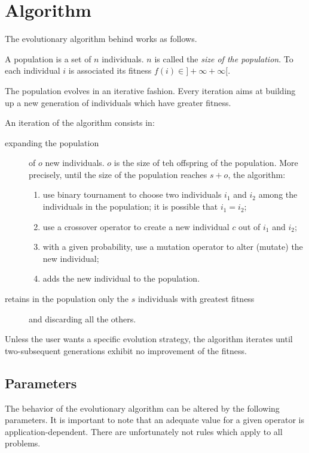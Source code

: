 \documentclass{article}
\begin{document}
\section{Algorithm}

The evolutionary algorithm behind \drwin works as follows.

A population is a set of $n$ individuals. $n$ is called the
\textit{size of the population}. To each individual $i$ is associated
its  fitness $f(i) \in ]+\infty +\infty[$. 

The population evolves in an iterative fashion. Every iteration aims at building
up a new generation of individuals which have greater fitness.

An iteration of the algorithm consists in:
\begin{description}
  \item[expanding the population] of $o$ new individuals. $o$ is the size of teh
  offspring of the population.
  More precisely, until the size of the population reaches $s+o$, the algorithm:
  \begin{enumerate}
  \item use binary tournament to choose two individuals $i_1$ and $i_2$
   among the individuals in the population; it is
  possible that $i_1=i_2$;
  \item use a crossover operator to create a new
  individual $c$ out of $i_1$ and $i_2$;
  \item with a given probability, use a mutation operator to alter (mutate) the
  new individual;
  \item adds the new individual to the population.
\end{enumerate}
  \item[retains in the population only the $s$ individuals with greatest
  fitness] and discarding all the others.
\end{description}


Unless the user wants a specific evolution strategy, the algorithm
iterates until two-subsequent generations exhibit no improvement of the fitness.

\subsection{Parameters}

The behavior of the evolutionary algorithm can be altered by the following
parameters. It is important to note that an adequate value for a given operator
is application-dependent. There are unfortunately not rules which apply to all
problems.
\end{document}
